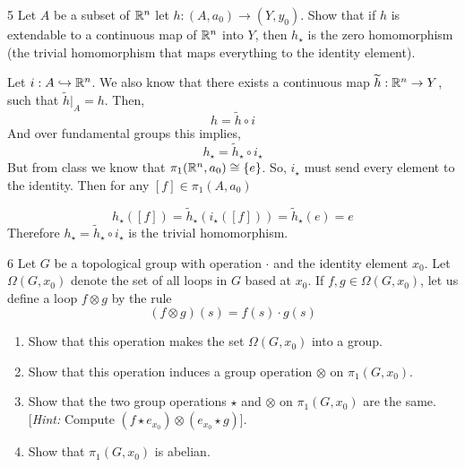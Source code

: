 \documentclass[12pt]{article}
\begin{document}
\newpage

\begin{problem}{5}
    Let $A$ be a subset of $\mathbb R^n$ let $h: (A, a_0) \to (Y, y_0)$. Show that if $h$ is extendable to a continuous map of $\mathbb R^n$ into $Y$, then $h_\star$ is the zero homomorphism (the trivial homomorphism that maps everything to the identity element). 
\end{problem}

\begin{solution}
    \bbni 
    
    Let $i: A \hookrightarrow \mathbb R^n$. We also know that there exists a continuous map $\widetilde{h} : \mathbb R^n \to Y$, such that $\widetilde{h}|_A = h$. Then, 
    \[h = \widetilde{h} \circ i\]
    And over fundamental groups this implies, 
    \[h_\star = \widetilde{h}_\star \circ i_\star \]
    But from class we know that $\pi_1(\mathbb R^n, a_0) \cong \{e\}$. So, $i_\star$  must send every element to the identity. Then for any $[f] \in \pi_1(A, a_0)$

    \[h_\star([f]) = \widetilde{h}_\star(i_\star([f])) = \widetilde{h}_\star(e) = e\]
    Therefore $h_\star = \widetilde{h}_\star \circ i_\star$ is the trivial homomorphism. 
\end{solution}

\newpage 

\begin{problem}{6}
    Let $G$ be a topological group with operation $\cdot$ and the identity element $x_0$. Let $\Omega(G, x_0)$ denote the set of all loops in $G$ based at $x_0$. If $f, g \in \Omega(G, x_0)$, let us define a loop $f \otimes g$ by the rule 
    \[(f \otimes g)(s) = f(s) \cdot g(s)\]
    \begin{enumerate}
        \item Show that this operation makes the set $\Omega(G, x_0)$ into a group. 
        \item Show that this operation induces a group operation $\otimes$ on $\pi_1(G, x_0)$. 
        \item Show that the two group operations $\star$ and $\otimes$ on $\pi_1(G, x_0)$ are the same. [\textit{Hint:} Compute $(f \star e_{x_0})\otimes(e_{x_0}\star g)$]. 
        \item Show that $\pi_1(G, x_0)$ is abelian. 
    \end{enumerate}
\end{problem}
\end{document}
